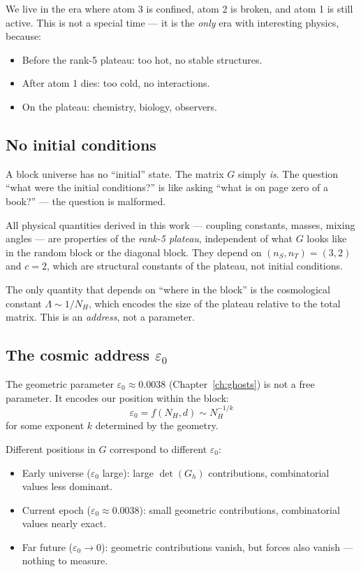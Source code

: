 We live in the era where atom 3 is confined, atom 2 is broken, and atom 1 is still active. This is not a special time --- it is the \emph{only} era with interesting physics, because:
\begin{itemize}
\item Before the rank-5 plateau: too hot, no stable structures.
\item After atom 1 dies: too cold, no interactions.
\item On the plateau: chemistry, biology, observers.
\end{itemize}

\subsection{No initial conditions}

A block universe has no ``initial'' state. The matrix $G$ simply \emph{is}. The question ``what were the initial conditions?'' is like asking ``what is on page zero of a book?'' --- the question is malformed.

All physical quantities derived in this work --- coupling constants, masses, mixing angles --- are properties of the \emph{rank-5 plateau}, independent of what $G$ looks like in the random block or the diagonal block. They depend on $(n_S, n_T) = (3, 2)$ and $c = 2$, which are structural constants of the plateau, not initial conditions.

The only quantity that depends on ``where in the block'' is the cosmological constant $\Lambda \sim 1/N_H$, which encodes the size of the plateau relative to the total matrix. This is an \emph{address}, not a parameter.

\subsection{The cosmic address $\varepsilon_0$}

The geometric parameter $\varepsilon_0 \approx 0.0038$ (Chapter~\ref{ch:ghosts}) is not a free parameter. It encodes our position within the block:
\begin{equation}
\varepsilon_0 = f(N_H, d) \sim N_H^{-1/k}
\end{equation}
for some exponent $k$ determined by the geometry.

Different positions in $G$ correspond to different $\varepsilon_0$:
\begin{itemize}
\item Early universe ($\varepsilon_0$ large): large $\det(G_h)$ contributions, combinatorial values less dominant.
\item Current epoch ($\varepsilon_0 \approx 0.0038$): small geometric contributions, combinatorial values nearly exact.
\item Far future ($\varepsilon_0 \to 0$): geometric contributions vanish, but forces also vanish --- nothing to measure.
\end{itemize}

